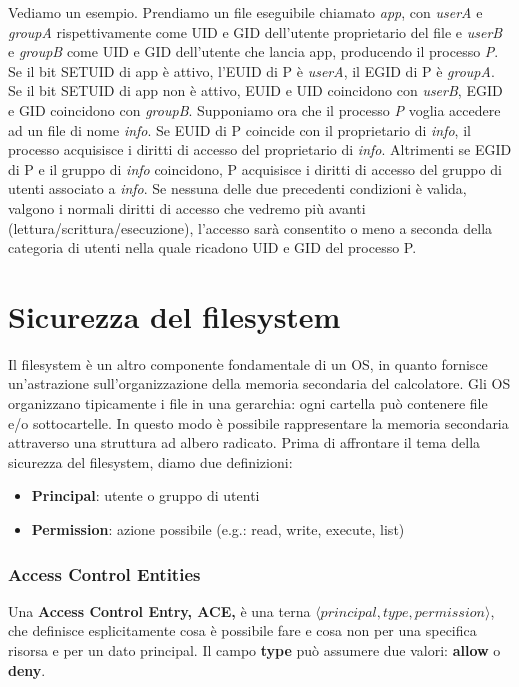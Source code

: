 Vediamo un esempio. Prendiamo un file eseguibile chiamato \textit{app}, con \textit{userA} e \textit{groupA} rispettivamente come UID e GID dell'utente proprietario del file e \textit{userB} e \textit{groupB} come UID e GID dell'utente che lancia app, producendo il processo \textit{P}. Se il bit SETUID di app è attivo, l'EUID di P è \textit{userA}, il EGID di P è \textit{groupA}. Se il bit SETUID di app non è attivo, EUID e UID coincidono con \textit{userB}, EGID e GID coincidono con \textit{groupB}. Supponiamo ora che il processo \textit{P} voglia accedere ad un file di nome \textit{info}. Se EUID di P coincide con il proprietario di \textit{info}, il processo acquisisce i diritti di accesso del proprietario di \textit{info}. Altrimenti se EGID di P e il gruppo di \textit{info} coincidono, P acquisisce i diritti di accesso del gruppo di utenti associato a \textit{info}. Se nessuna delle due precedenti condizioni è valida, valgono i normali diritti di accesso che vedremo più avanti (lettura/scrittura/esecuzione), l'accesso sarà consentito o meno a seconda della categoria di utenti nella quale ricadono UID e GID del processo P.

\section{Sicurezza del filesystem}
Il filesystem è un altro componente fondamentale di un OS, in quanto fornisce un'astrazione sull'organizzazione della memoria secondaria del calcolatore. Gli OS organizzano tipicamente i file in una gerarchia: ogni cartella può contenere file e/o sottocartelle. In questo modo è possibile rappresentare la memoria secondaria attraverso una struttura ad albero radicato. Prima di affrontare il tema della sicurezza del filesystem, diamo due definizioni:
\begin{itemize}
  \item \textbf{Principal}: utente o gruppo di utenti
  \item \textbf{Permission}: azione possibile (e.g.: read, write, execute, list)
\end{itemize}

\subsubsection{Access Control Entities}
Una \textbf{Access Control Entry, ACE,} è una terna $\langle principal, type, permission \rangle$, che definisce esplicitamente cosa è possibile fare e cosa non per una specifica risorsa e per un dato principal. Il campo \textbf{type} può assumere due valori: \textbf{allow} o \textbf{deny}. \newline 

